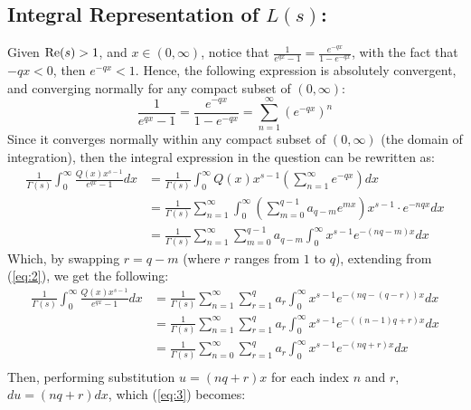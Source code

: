 \documentclass{article}
\begin{document}
\subsection{Integral Representation of $L(s)$:}
Given $\textmd{Re}(s)>1$, and $x\in (0,\infty)$, notice that $\frac{1}{e^{qx}-1} = \frac{e^{-qx}}{1-e^{-qx}}$, with the fact that $-qx <0$, then $e^{-qx}<1$. Hence, the following expression is absolutely convergent, and converging normally for any compact subset of $(0,\infty)$:
\begin{equation}
    \label{eq:1}
    \frac{1}{e^{qx}-1}=\frac{e^{-qx}}{1-e^{-qx}} = \sum_{n=1}^{\infty}(e^{-qx})^n
\end{equation}
Since it converges normally within any compact subset of $(0,\infty)$ (the domain of integration), then the integral expression in the question can be rewritten as:
\begin{equation}
    \label{eq:2}
    \begin{split}
        \frac{1}{\Gamma(s)}\int_{0}^{\infty}\frac{Q(x)x^{s-1}}{e^{qx}-1}dx &= \frac{1}{\Gamma(s)}\int_{0}^{\infty}Q(x)x^{s-1}\left(\sum_{n=1}^{\infty}e^{-qx}\right)dx\\
        &= \frac{1}{\Gamma(s)}\sum_{n=1}^{\infty}\int_{0}^{\infty}\left(\sum_{m=0}^{q-1}a_{q-m}e^{mx}\right)x^{s-1}\cdot e^{-nqx}dx\\
        &= \frac{1}{\Gamma(s)}\sum_{n=1}^{\infty}\sum_{m=0}^{q-1}a_{q-m}\int_{0}^{\infty}x^{s-1}e^{-(nq-m)x}dx
    \end{split}
\end{equation}
Which, by swapping $r=q-m$ (where $r$ ranges from $1$ to $q$), extending from (\ref{eq:2}), we get the following:
\begin{equation}
    \label{eq:3}
    \begin{split}
        \frac{1}{\Gamma(s)}\int_{0}^{\infty}\frac{Q(x)x^{s-1}}{e^{qx}-1}dx &= \frac{1}{\Gamma(s)}\sum_{n=1}^{\infty}\sum_{r=1}^{q}a_r\int_{0}^{\infty}x^{s-1}e^{-(nq-(q-r))x}dx\\
        &= \frac{1}{\Gamma(s)}\sum_{n=1}^{\infty}\sum_{r=1}^{q}a_r\int_{0}^{\infty}x^{s-1}e^{-((n-1)q+r)x}dx\\
        &=\frac{1}{\Gamma(s)}\sum_{n=0}^{\infty}\sum_{r=1}^{q}a_r\int_{0}^{\infty}x^{s-1}e^{-(nq+r)x}dx\\
    \end{split}
\end{equation}
Then, performing substitution $u = (nq+r)x$ for each index $n$ and $r$, $du = (nq+r)dx$, which (\ref{eq:3}) becomes:
\end{document}
